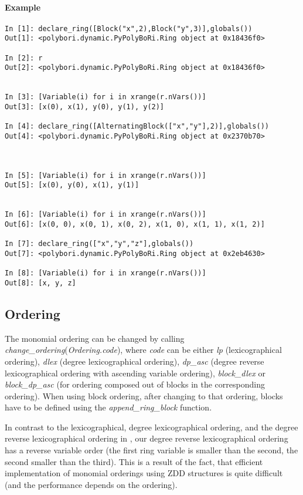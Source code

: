 \documentclass[]{article}
\newcommand{\functionname}[1]{\textit{#1}\xspace}
\begin{document}
\paragraph{Example}
\begin{verbatim}
In [1]: declare_ring([Block("x",2),Block("y",3)],globals())
Out[1]: <polybori.dynamic.PyPolyBoRi.Ring object at 0x18436f0>

In [2]: r
Out[2]: <polybori.dynamic.PyPolyBoRi.Ring object at 0x18436f0>


In [3]: [Variable(i) for i in xrange(r.nVars())]
Out[3]: [x(0), x(1), y(0), y(1), y(2)]

In [4]: declare_ring([AlternatingBlock(["x","y"],2)],globals())
Out[4]: <polybori.dynamic.PyPolyBoRi.Ring object at 0x2370b70>



In [5]: [Variable(i) for i in xrange(r.nVars())]
Out[5]: [x(0), y(0), x(1), y(1)]


In [6]: [Variable(i) for i in xrange(r.nVars())]
Out[6]: [x(0, 0), x(0, 1), x(0, 2), x(1, 0), x(1, 1), x(1, 2)]

In [7]: declare_ring(["x","y","z"],globals())
Out[7]: <polybori.dynamic.PyPolyBoRi.Ring object at 0x2eb4630>

In [8]: [Variable(i) for i in xrange(r.nVars())]
Out[8]: [x, y, z]  
\end{verbatim}



\subsection{Ordering}
The monomial ordering can be changed by calling
\functionname{change\_ordering}(\functionname{Ordering.code}), where \functionname{code} can be either \functionname{lp} (lexicographical ordering), \functionname{dlex} (degree lexicographical ordering), \functionname{dp\_asc} (degree reverse lexicographical ordering with ascending variable ordering), \functionname{block\_dlex} or \functionname{block\_dp\_asc} (for ordering composed out of blocks in the corresponding ordering). When using block ordering, after changing to that ordering, blocks have to be defined using the \functionname{append\_ring\_block} function.

In contrast to the lexicographical, degree lexicographical ordering, and the degree reverse lexicographical ordering in \Singular, our degree reverse lexicographical ordering has a reverse variable order (the first ring variable is smaller than the second, the second smaller than the third). This is a result of the fact, that efficient implementation of monomial orderings using ZDD structures is quite difficult (and the performance depends on the ordering).
\end{document}
